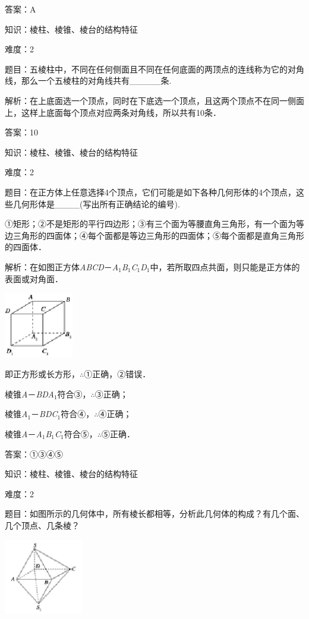 \documentclass{article} %
\begin{document}
答案：A

知识：棱柱、棱锥、棱台的结构特征

难度：2

题目：五棱柱中，不同在任何侧面且不同在任何底面的两顶点的连线称为它的对角线，那么一个五棱柱的对角线共有\_\_\_\_\_条.

解析：在上底面选一个顶点，同时在下底选一个顶点，且这两个顶点不在同一侧面上，这样上底面每个顶点对应两条对角线，所以共有10条．

答案：10


知识：棱柱、棱锥、棱台的结构特征

难度：2

题目：在正方体上任意选择4个顶点，它们可能是如下各种几何形体的4个顶点，这些几何形体是\_\_\_\_(写出所有正确结论的编号).

①矩形；②不是矩形的平行四边形；③有三个面为等腰直角三角形，有一个面为等边三角形的四面体；④每个面都是等边三角形的四面体；⑤每个面都是直角三角形的四面体．

解析：在如图正方体\textit{ABCD}－\textit{A}${}_{1}$\textit{B}${}_{1}$\textit{C}${}_{1}$\textit{D}${}_{1}$中，若所取四点共面，则只能是正方体的表面或对角面．

\includegraphics*[width=1.19in, height=1.13in, keepaspectratio=false]{image11}

即正方形或长方形，$\mathrm{\therefore}$①正确，②错误．

棱锥\textit{A}－\textit{BDA}${}_{1}$符合③，$\mathrm{\therefore}$③正确；

棱锥\textit{A}${}_{1}$－\textit{BDC}${}_{1}$符合④，$\mathrm{\therefore}$④正确；

棱锥\textit{A}－\textit{A}${}_{1}$\textit{B}${}_{1}$\textit{C}${}_{1}$符合⑤，$\mathrm{\therefore}$⑤正确．

答案：①③④⑤

知识：棱柱、棱锥、棱台的结构特征

难度：2

题目：如图所示的几何体中，所有棱长都相等，分析此几何体的构成？有几个面、几个顶点、几条棱？

\includegraphics*[width=1.35in, height=1.31in, keepaspectratio=false]{image12}
\end{document}
